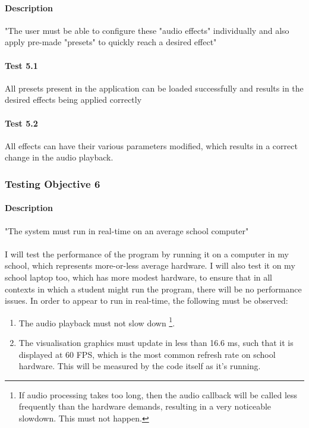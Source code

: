 \paragraph{Description} "The user must be able to configure these "audio effects" individually and also apply pre-made "presets" to quickly reach a desired effect"

\paragraph{Test 5.1} All presets present in the application can be loaded successfully and results in the desired effects being applied correctly
\paragraph{Test 5.2} All effects can have their various parameters modified, which results in a correct change in the audio playback.

\pagebreak
\subsubsection{Testing Objective 6}
\paragraph{Description}  "The system must run in real-time on an average school computer"

\paragraph{}
I will test the performance of the program by running it on a computer in my school, which represents more-or-less average hardware.
I will also test it on my school laptop too, which has more modest hardware, to ensure that in all contexts in which a student might run the program, there will be no performance issues.
In order to appear to run in real-time, the following must be observed:
\begin{enumerate}
	\item The audio  playback must not slow down \footnote{If audio processing takes too long, then the audio callback will be called less frequently than the hardware demands, resulting
		in a very noticeable slowdown. This must not happen.}.
	\item The visualisation graphics must update in less than 16.6 ms, such that it is displayed at 60 FPS, which is the most common refresh rate on school hardware. This will be measured by
	the code itself as it's running.
\end{enumerate}

